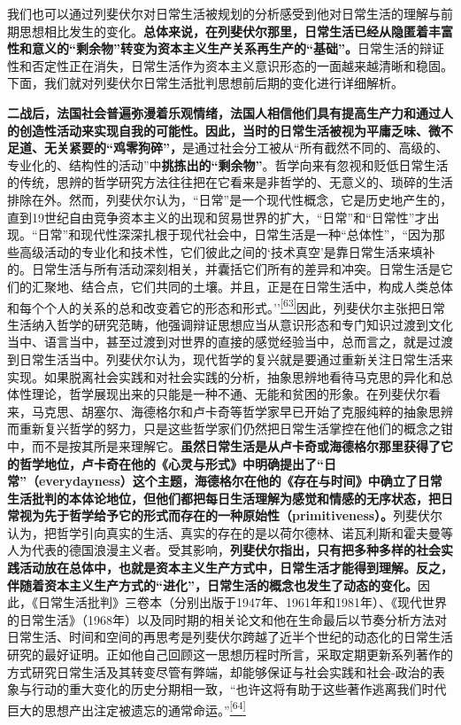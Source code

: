 \documentclass[UTF8, fontset = sourcesans, a4paper, oneside, zihao =
-4, scheme=chinese, no-math, space=true]{ctexbook}
\begin{document}
我们也可以通过列斐伏尔对日常生活被规划的分析感受到他对日常生活的理解与前期思想相比发生的变化。\textbf{总体来说，在列斐伏尔那里，日常生活已经从隐匿着丰富性和意义的``剩余物''转变为资本主义生产关系再生产的``基础''。}日常生活的辩证性和否定性正在消失，日常生活作为资本主义意识形态的一面越来越清晰和稳固。下面，我们就对列斐伏尔日常生活批判思想前后期的变化进行详细解析。

\textbf{二战后，法国社会普遍弥漫着乐观情绪，法国人相信他们具有提高生产力和通过人的创造性活动来实现自我的可能性。因此，当时的日常生活被视为平庸乏味、微不足道、无关紧要的``鸡零狗碎''，}是通过社会分工被从``所有截然不同的、高级的、专业化的、结构性的活动''中\textbf{挑拣出的``剩余物''}。哲学向来有忽视和贬低日常生活的传统，思辨的哲学研究方法往往把在它看来是非哲学的、无意义的、琐碎的生活排除在外。然而，列斐伏尔认为，``日常''是一个现代性概念，它是历史地产生的，直到19世纪自由竞争资本主义的出现和贸易世界的扩大，``日常''和``日常性''才出现。``日常''和现代性深深扎根于现代社会中，日常生活是一种``总体性''，``因为那些高级活动的专业化和技术性，它们彼此之间的`技术真空'是靠日常生活来填补的。日常生活与所有活动深刻相关，并囊括它们所有的差异和冲突。日常生活是它们的汇聚地、结合点，它们共同的土壤。并且，正是在日常生活中，构成人类总体和每个个人的关系的总和改变着它的形态和形式。''\protect\hypertarget{part0007_split_004.htmlux5cux23w63}{}{}\protect\hyperlink{part0007_split_004.htmlux5cux23m63}{\textsuperscript{{[}63{]}}}因此，列斐伏尔主张把日常生活纳入哲学的研究范畴，他强调辩证思想应当从意识形态和专门知识过渡到文化当中、语言当中，甚至过渡到对世界的直接的感觉经验当中，总而言之，就是过渡到日常生活当中。列斐伏尔认为，现代哲学的复兴就是要通过重新关注日常生活来实现。如果脱离社会实践和对社会实践的分析，抽象思辨地看待马克思的异化和总体性理论，哲学展现出来的只能是一种不通、无能和贫困的形象。在列斐伏尔看来，马克思、胡塞尔、海德格尔和卢卡奇等哲学家早已开始了克服纯粹的抽象思辨而重新复兴哲学的努力，只是这些哲学家们仍然把日常生活掌控在他们的概念之钳中，而不是按其所是来理解它。\textbf{虽然日常生活是从卢卡奇或海德格尔那里获得了它的哲学地位，卢卡奇在他的《心灵与形式》中明确提出了``日常''（everydayness）这个主题，海德格尔在他的《存在与时间》中确立了日常生活批判的本体论地位，但他们都把每日生活理解为感觉和情感的无序状态，把日常视为先于哲学给予它的形式而存在的一种原始性（primitiveness）。}列斐伏尔认为，把哲学引向真实的生活、真实的存在的是以荷尔德林、诺瓦利斯和霍夫曼等人为代表的德国浪漫主义者。受其影响，\textbf{列斐伏尔指出，只有把多种多样的社会实践活动放在总体中，也就是资本主义生产方式中，日常生活才能得到理解。反之，伴随着资本主义生产方式的``进化''，日常生活的概念也发生了动态的变化。}因此，《日常生活批判》三卷本（分别出版于1947年、1961年和1981年）、《现代世界的日常生活》（1968年）以及同时期的相关论文和他在生命最后以节奏分析方法对日常生活、时间和空间的再思考是列斐伏尔跨越了近半个世纪的动态化的日常生活研究的最好证明。正如他自己回顾这一思想历程时所言，采取定期更新系列著作的方式研究日常生活及其转变尽管有弊端，却能够保证与社会实践和社会-政治的表象与行动的重大变化的历史分期相一致，``也许这将有助于这些著作逃离我们时代巨大的思想产出注定被遗忘的通常命运。''\protect\hypertarget{part0007_split_004.htmlux5cux23w64}{}{}\protect\hyperlink{part0007_split_004.htmlux5cux23m64}{\textsuperscript{{[}64{]}}}
\end{document}

